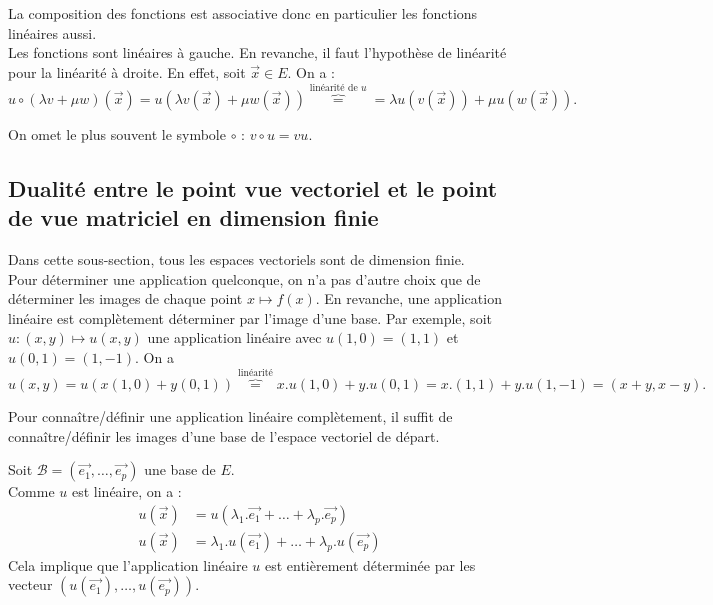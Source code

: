 \documentclass{book}
\begin{document}
\begin{Demonstration}
La composition des fonctions est associative donc en particulier les fonctions linéaires aussi.\\
Les fonctions sont linéaires à gauche. En revanche, il faut l'hypothèse de linéarité pour la linéarité à droite. En effet, soit $\vec{x}\in E$. On a :
$$u\circ (\lambda v+ \mu w)(\vec{x})=u(\lambda v(\vec{x})+ \mu w(\vec{x}))\overbrace{=}^{\text{linéarité de }u}=\lambda u(v(\vec{x})) + \mu u(w(\vec{x})).$$
\end{Demonstration}

\begin{Remarque} On omet le plus souvent le symbole  $\circ$ : $v\circ u =v u$.
\end{Remarque}
\subsection{Dualité entre le point vue vectoriel et le  point de vue matriciel en dimension finie}
Dans cette sous-section, tous les espaces vectoriels sont de dimension finie.\\
Pour déterminer une application quelconque, on n'a pas d'autre choix que de déterminer les images de chaque point $x\mapsto f(x)$. En revanche,   une application linéaire est complètement déterminer par l'image d'une base. Par exemple, soit $u:(x,y)\mapsto u(x,y)$ une application linéaire avec $u(1,0)=(1,1)$ et $u(0,1)=(1,-1)$. On a 
$$u(x,y)=u(x(1,0)+y(0,1))\overbrace{=}^{\text{linéarité}}x.u(1,0)+ y.u(0,1)=x.(1,1)+ y.u(1,-1)=(x+y,x-y).$$     
\begin{Theoreme}
Pour connaître/définir une application linéaire complètement, il suffit de connaître/définir les  images d'une base de l'espace vectoriel de départ. 
\end{Theoreme}
\begin{Demonstration}
Soit $\mathcal{B}=(\vec{e_1},\dots,\vec{e_p})$ une base de $E$.\\
Comme $u$ est linéaire, on a :
\begin{align}
u(\vec{x})&=u(\lambda_1.\vec{e_1}+\dots +\lambda_p.\vec{e_p})\\
u(\vec{x})&=\lambda_1.u(\vec{e_1})+\dots +\lambda_p.u(\vec{e_p})
\end{align}
Cela implique que l'application linéaire $u$ est entièrement déterminée par les vecteur $(u(\vec{e_1}),\dots,u(\vec{e_p}))$.
\end{Demonstration}
\end{document}
